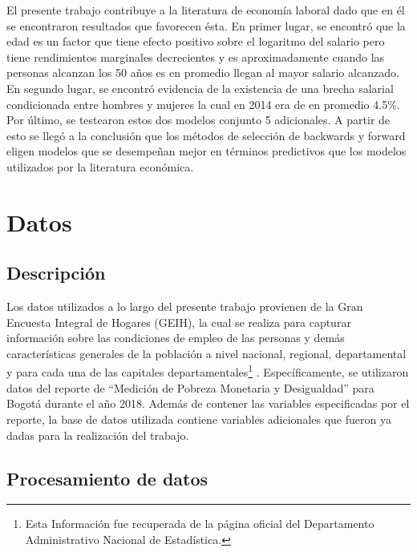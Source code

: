 \documentclass[12pt]{article}
\begin{document}
El presente trabajo contribuye a la literatura de economía laboral dado que en él se encontraron resultados que favorecen ésta. En primer lugar, se encontró que la edad es un factor que tiene efecto positivo sobre el logaritmo del salario pero tiene rendimientos marginales decrecientes y es aproximadamente cuando las personas alcanzan los 50 años es en promedio llegan al mayor salario alcanzado. En segundo lugar, se encontró evidencia de la existencia de una brecha salarial condicionada entre hombres y mujeres la cual en 2014 era de en promedio 4.5\%. Por último, se testearon estos dos modelos conjunto 5 adicionales. A partir de esto se llegó a la conclusión que los métodos de selección de backwards y forward eligen modelos que se desempeñan mejor en términos predictivos que los modelos utilizados por la literatura económica. \\


\section{Datos}

\subsection{Descripción}

Los datos utilizados a lo largo del presente trabajo provienen de la Gran Encuesta Integral de Hogares (GEIH), la cual se realiza para capturar información sobre las condiciones de empleo de las personas y demás características generales de la población a nivel nacional, regional, departamental y para cada una de las capitales departamentales\footnote{Esta Información fue recuperada de la página oficial del Departamento Administrativo Nacional de Estadística.} . Específicamente, se utilizaron datos del reporte de “Medición de Pobreza Monetaria y Desigualdad” para Bogotá durante el año 2018. Además de contener las variables especificadas por el reporte, la base de datos utilizada contiene variables adicionales que fueron ya dadas para la realización del trabajo.

\subsection{Procesamiento de datos}
\end{document}
